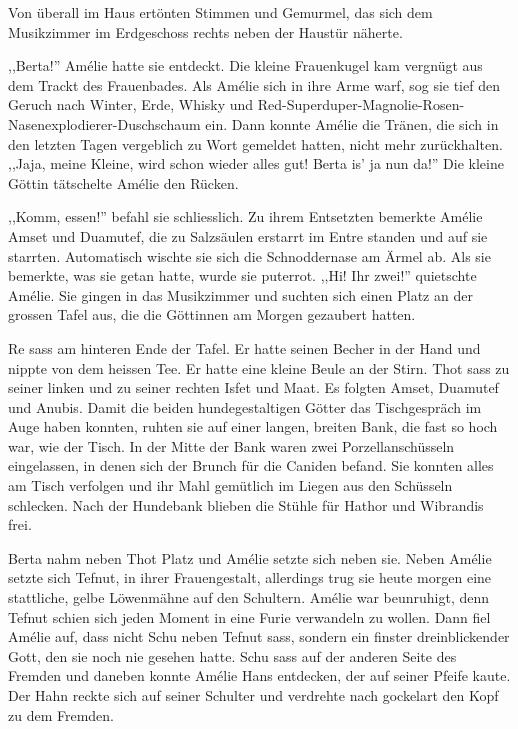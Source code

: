 \documentclass[11pt,titlepage,a5paper]{book}
\begin{document}
Von überall im Haus ertönten Stimmen und Gemurmel, das sich dem Musikzimmer im Erdgeschoss rechts neben der Haustür näherte.

,,Berta!'' Amélie hatte sie entdeckt. Die kleine Frauenkugel kam vergnügt aus dem Trackt des Frauenbades. Als Amélie sich in ihre Arme warf, sog sie tief den Geruch nach Winter, Erde, Whisky und Red-Superduper-Magnolie-Rosen-Nasenexplodierer-Duschschaum ein. Dann konnte Amélie die Tränen, die sich in den letzten Tagen vergeblich zu Wort gemeldet hatten, nicht mehr zurückhalten. ,,Jaja, meine Kleine, wird schon wieder alles gut! Berta is' ja nun da!'' Die kleine Göttin tätschelte Amélie den Rücken. 

,,Komm, essen!'' befahl sie schliesslich. Zu ihrem Entsetzten bemerkte Amélie Amset und Duamutef, die zu Salzsäulen erstarrt im Entre standen und auf sie starrten. Automatisch wischte sie sich die Schnoddernase am Ärmel ab. Als sie bemerkte, was sie getan hatte, wurde sie puterrot. ,,Hi! Ihr zwei!'' quietschte Amélie. Sie gingen in das Musikzimmer und suchten sich einen Platz an der grossen Tafel aus, die die Göttinnen am Morgen gezaubert hatten.

Re sass am hinteren Ende der Tafel. Er hatte seinen Becher in der Hand und nippte von dem heissen Tee. Er hatte eine kleine Beule an der Stirn. Thot sass zu seiner linken und zu seiner rechten Isfet und Maat. Es folgten Amset, Duamutef und Anubis. Damit die beiden hundegestaltigen Götter das Tischgespräch im Auge haben konnten, ruhten sie auf einer langen, breiten Bank, die fast so hoch war, wie der Tisch. In der Mitte der Bank waren zwei Porzellanschüsseln eingelassen, in denen sich der Brunch für die Caniden befand. Sie konnten alles am Tisch verfolgen und ihr Mahl gemütlich im Liegen aus den Schüsseln schlecken. Nach der Hundebank blieben die Stühle für Hathor und Wibrandis frei.

Berta nahm neben Thot Platz und Amélie setzte sich neben sie. Neben Amélie setzte sich Tefnut, in ihrer Frauengestalt, allerdings trug sie heute morgen eine stattliche, gelbe Löwenmähne auf den Schultern. Amélie war beunruhigt, denn Tefnut schien sich jeden Moment in eine Furie verwandeln zu wollen. Dann fiel Amélie auf, dass nicht Schu neben Tefnut sass, sondern ein finster dreinblickender Gott, den sie noch nie gesehen hatte. Schu sass auf der anderen Seite des Fremden und daneben konnte Amélie Hans entdecken, der auf seiner Pfeife kaute. Der Hahn reckte sich auf seiner Schulter und verdrehte nach gockelart den Kopf zu dem Fremden.
\end{document}
